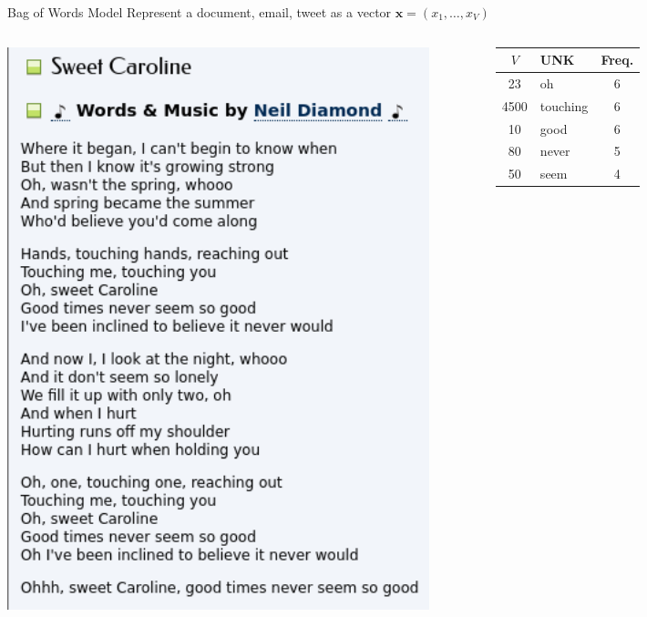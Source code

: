 \documentclass[handout]{beamer}
\newcommand{\bx}{\mathbf{x}}
\begin{document}
\begin{frame}{Bag of Words Model}
    Represent a document, email, tweet as a vector $\bx=(x_1,\ldots, x_V)$
    \begin{columns}[T]
        \begin{column}{0.6\textwidth}
            \includegraphics[width=0.9\textwidth]{sweet_caroline_lyrics.png}
        \end{column}
        \begin{column}{0.4\textwidth}
            \begin{tabular}{|c|l|c|}
                \hline
                \hline
                $V$ & UNK& Freq. \\
                \hline
                \hline
                23 & oh&6\\
                \hline
                4500 & touching&6\\
                \hline
                10 & good&6\\
                \hline
                80 & never&5\\
                \hline
                50 & seem&4\\

\end{tabular}
\end{column}
\end{columns}
\end{frame}
\end{document}
